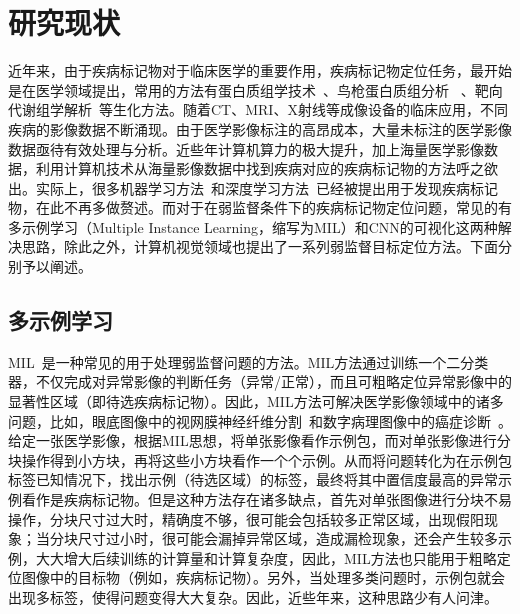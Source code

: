 \section{研究现状}
\label{sec:related_work}
近年来，由于疾病标记物对于临床医学的重要作用，疾病标记物定位任务，最开始是在医学领域提出，常用的方法有蛋白质组学技术~\cite{srinivas2002proteomics}、鸟枪蛋白质组分析~\cite{hu2008salivary} 、靶向代谢组学解析~\cite{griffiths2010targeted}等生化方法。随着CT、MRI、X射线等成像设备的临床应用，不同疾病的影像数据不断涌现。由于医学影像标注的高昂成本，大量未标注的医学影像数据亟待有效处理与分析。近些年计算机算力的极大提升，加上海量医学影像数据，利用计算机技术从海量影像数据中找到疾病对应的疾病标记物的方法呼之欲出。实际上，很多机器学习方法~\cite{huynh2012statistical, he2010stable, mamoshina2018machine, swan2013application}和深度学习方法~\cite{yao2016imaging, zafeiris2018artificial, li2019efficient}已经被提出用于发现疾病标记物，在此不再多做赘述。而对于在弱监督条件下的疾病标记物定位问题，常见的有多示例学习（Multiple Instance Learning，缩写为MIL）和CNN的可视化这两种解决思路，除此之外，计算机视觉领域也提出了一系列弱监督目标定位方法。下面分别予以阐述。


\subsection{多示例学习}
MIL~\cite{maron1998framework}是一种常见的用于处理弱监督问题的方法。MIL方法通过训练一个二分类器，不仅完成对异常影像的判断任务（异常/正常），而且可粗略定位异常影像中的显著性区域（即待选疾病标记物）。因此，MIL方法可解决医学影像领域中的诸多问题，比如，眼底图像中的视网膜神经纤维分割~\cite{manivannan2017subcategory}和数字病理图像中的癌症诊断~\cite{kandemir2014empowering}。给定一张医学影像，根据MIL思想，将单张影像看作示例包，而对单张影像进行分块操作得到小方块，再将这些小方块看作一个个示例。从而将问题转化为在示例包标签已知情况下，找出示例（待选区域）的标签，最终将其中置信度最高的异常示例看作是疾病标记物。但是这种方法存在诸多缺点，首先对单张图像进行分块不易操作，分块尺寸过大时，精确度不够，很可能会包括较多正常区域，出现假阳现象；当分块尺寸过小时，很可能会漏掉异常区域，造成漏检现象，还会产生较多示例，大大增大后续训练的计算量和计算复杂度，因此，MIL方法也只能用于粗略定位图像中的目标物（例如，疾病标记物）。另外，当处理多类问题时，示例包就会出现多标签，使得问题变得大大复杂。因此，近些年来，这种思路少有人问津。

